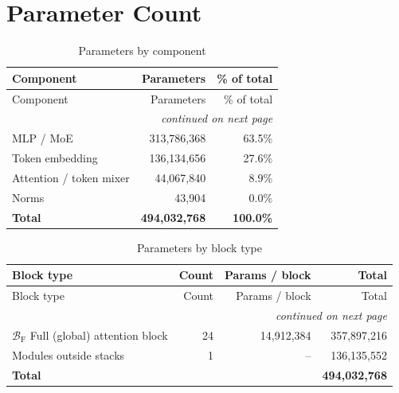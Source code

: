 \documentclass[10pt,a4paper]{article}
\theoremstyle{definition}
\begin{document}
\section{Parameter Count}
\begin{longtable}{lrr}
\caption{Parameters by component}\\
\toprule
Component & Parameters & \% of total \\
\midrule
\endfirsthead
\toprule
Component & Parameters & \% of total \\
\midrule
\endhead
\midrule \multicolumn{3}{r}{\textit{continued on next page}} \\
\endfoot
\bottomrule
\endlastfoot
MLP / MoE & 313,786,368 & 63.5\% \\
Token embedding & 136,134,656 & 27.6\% \\
Attention / token mixer & 44,067,840 & 8.9\% \\
Norms & 43,904 & 0.0\% \\
\midrule \textbf{Total} & \textbf{494,032,768} & \textbf{100.0\%} \\
\end{longtable}
\begin{longtable}{p{8cm}rrr}
\caption{Parameters by block type}\\
\toprule
Block type & Count & Params / block & Total \\
\midrule
\endfirsthead
\toprule
Block type & Count & Params / block & Total \\
\midrule
\endhead
\midrule \multicolumn{4}{r}{\textit{continued on next page}} \\
\endfoot
\bottomrule
\endlastfoot
$\mathcal{B}_{\mathrm{F}}$ Full (global) attention block & 24 & 14,912,384 & 357,897,216 \\
Modules outside stacks & 1 & -- & 136,135,552 \\
\midrule \textbf{Total} & & & \textbf{494,032,768} \\
\end{longtable}
\end{document}
